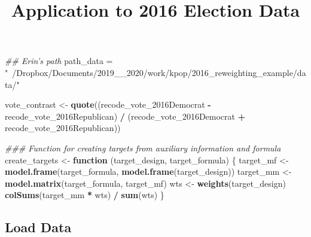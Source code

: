 \documentclass[
]{article}
\title{Application to 2016 Election Data}
\author{}
\date{\vspace{-2.5em}}
\newenvironment{Shaded}{\begin{snugshade}}{\end{snugshade}}
\newcommand{\CommentTok}[1]{\textcolor[rgb]{0.56,0.35,0.01}{\textit{#1}}}
\newcommand{\ControlFlowTok}[1]{\textcolor[rgb]{0.13,0.29,0.53}{\textbf{#1}}}
\newcommand{\KeywordTok}[1]{\textcolor[rgb]{0.13,0.29,0.53}{\textbf{#1}}}
\newcommand{\NormalTok}[1]{#1}
\newcommand{\OperatorTok}[1]{\textcolor[rgb]{0.81,0.36,0.00}{\textbf{#1}}}
\newcommand{\StringTok}[1]{\textcolor[rgb]{0.31,0.60,0.02}{#1}}
\begin{document}
\maketitle

\begin{Shaded}
\begin{Highlighting}[]
\CommentTok{## Erin's path}
\NormalTok{path_data =}\StringTok{ "~/Dropbox/Documents/2019__2020/work/kpop/2016_reweighting_example/data/"}
\end{Highlighting}
\end{Shaded}

\begin{Shaded}
\begin{Highlighting}[]
\NormalTok{vote_contrast <-}\StringTok{ }\KeywordTok{quote}\NormalTok{((recode_vote_2016Democrat }\OperatorTok{-}\StringTok{ }\NormalTok{recode_vote_2016Republican) }\OperatorTok{/}
\StringTok{                           }\NormalTok{(recode_vote_2016Democrat }\OperatorTok{+}\StringTok{ }\NormalTok{recode_vote_2016Republican))}

\CommentTok{### Function for creating targets from auxiliary information and formula}
\NormalTok{create_targets <-}\StringTok{ }\ControlFlowTok{function}\NormalTok{ (target_design, target_formula) \{}
\NormalTok{    target_mf <-}\StringTok{ }\KeywordTok{model.frame}\NormalTok{(target_formula, }\KeywordTok{model.frame}\NormalTok{(target_design))}
\NormalTok{    target_mm <-}\StringTok{ }\KeywordTok{model.matrix}\NormalTok{(target_formula, target_mf)}
\NormalTok{    wts <-}\StringTok{ }\KeywordTok{weights}\NormalTok{(target_design)}
    \KeywordTok{colSums}\NormalTok{(target_mm }\OperatorTok{*}\StringTok{ }\NormalTok{wts) }\OperatorTok{/}\StringTok{ }\KeywordTok{sum}\NormalTok{(wts)}
\NormalTok{\}}
\end{Highlighting}
\end{Shaded}

\hypertarget{load-data}{%
\subsection{Load Data}\label{load-data}}
\end{document}

